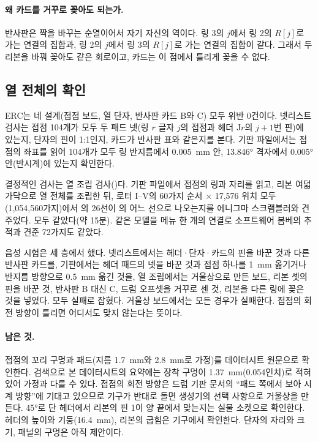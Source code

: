 \paragraph{왜 카드를 거꾸로 꽂아도 되는가.} 반사판은 짝을 바꾸는 순열이어서 자기 자신의 역이다. 링 3의 $j$에서
링 2의 $R[j]$로 가는 연결의 집합과, 링 2의 $j$에서 링 3의 $R[j]$로 가는 연결의 집합이 같다. 그래서 두 리본을
바꿔 꽂아도 같은 회로이고, 카드는 이 점에서 틀리게 꽂을 수 없다.

\subsection{열 전체의 확인}

ERC는 네 설계(접점 보드, 열 단자, 반사판 카드 B와 C) 모두 위반 0건이다. 넷리스트 검사는 접점 104개가 모두 두 패드
넷(링 $r$ 글자 $j$의 접점과 헤더 J$r$의 $j+1$번 핀)에 있는지, 단자의 핀이 1:1인지, 카드가 반사판 표와 같은지를 본다.
기판 파일에서는 접점의 좌표를 읽어 104개가 모두 링 반지름에서 0.005~mm 안, 13.846° 격자에서 0.005° 안(반시계)에
있는지 확인한다.

결정적인 검사는 열 조립 검사()다. 기판 파일에서 접점의 링과 자리를 읽고, 리본 여덟 가닥으로
열 전체를 조립한 뒤, 로터 I--V의 60가지 순서 $\times$ 17,576 위치 모두(1,054,560가지)에서 의 26선이
의 어느 선으로 나오는지를 에니그마 스크램블러와 견주었다. 모두 같았다(약 15분). 같은 모델을 메뉴 한 개의
연결로 소프트웨어 봄베의 추적과 견준 72가지도 같았다.

음성 시험은 세 층에서 했다. 넷리스트에서는 헤더·단자·카드의 핀을 바꾼 것과 다른 반사판 카드를, 기판에서는 헤더
패드의 넷을 바꾼 것과 접점 하나를 1~mm 옮기거나 반지름 방향으로 0.5~mm 옮긴 것을, 열 조립에서는 거울상으로 만든
보드, 리본 셋의 핀을 바꾼 것, 반사판 B 대신 C, 드럼 오프셋을 거꾸로 센 것,  리본을 다른 링에 꽂은 것을
넣었다. 모두 실패로 잡혔다. 거울상 보드에서는 모든 경우가 실패한다. 접점의 회전 방향이 틀리면 어디서도 맞지 않는다는
뜻이다.

\paragraph{남은 것.} 접점의 꼬리 구멍과 패드(지름 1.7~mm와 2.8~mm로 가정)를 데이터시트 원문으로 확인한다. 검색으로
본 데이터시트의 요약에는 장착 구멍이 1.37~mm(0.054인치)로 적혀 있어 가정과 다를 수 있다. 접점의 회전 방향은 드럼
기판 문서의 ``패드 쪽에서 보아 시계 방향''에 기대고 있으므로 기구가 반대로 돌면 생성기의 선택 사항으로 거울상을
만든다. 45°로 단 헤더에서 리본의 핀 1이 양 끝에서 맞는지는 실물 소켓으로 확인한다. 헤더의 높이와 기둥(16.4~mm),
리본의 굽힘은 기구에서 확인한다. 단자의 자리와 크기, 패널의 구멍은 아직 제안이다.

